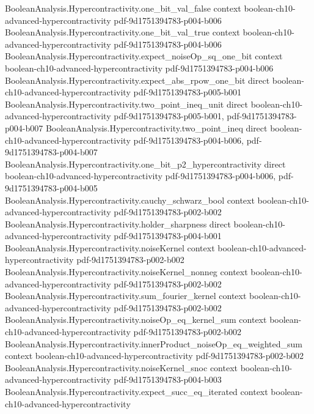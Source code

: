 \begin{theorem}
\proofstep
  {BooleanAnalysis.Hypercontractivity.one_bit_val_false}
  {context}
  {boolean-ch10-advanced-hypercontractivity}
  {pdf-9d1751394783-p004-b006}
\proofstep
  {BooleanAnalysis.Hypercontractivity.one_bit_val_true}
  {context}
  {boolean-ch10-advanced-hypercontractivity}
  {pdf-9d1751394783-p004-b006}
\proofstep
  {BooleanAnalysis.Hypercontractivity.expect_noiseOp_sq_one_bit}
  {context}
  {boolean-ch10-advanced-hypercontractivity}
  {pdf-9d1751394783-p004-b006}
\proofstep
  {BooleanAnalysis.Hypercontractivity.expect_abs_rpow_one_bit}
  {direct}
  {boolean-ch10-advanced-hypercontractivity}
  {pdf-9d1751394783-p005-b001}
\proofstep
  {BooleanAnalysis.Hypercontractivity.two_point_ineq_unit}
  {direct}
  {boolean-ch10-advanced-hypercontractivity}
  {pdf-9d1751394783-p005-b001,
    pdf-9d1751394783-p004-b007}
\proofstep
  {BooleanAnalysis.Hypercontractivity.two_point_ineq}
  {direct}
  {boolean-ch10-advanced-hypercontractivity}
  {pdf-9d1751394783-p004-b006,
    pdf-9d1751394783-p004-b007}
\proofstep
  {BooleanAnalysis.Hypercontractivity.one_bit_p2_hypercontractivity}
  {direct}
  {boolean-ch10-advanced-hypercontractivity}
  {pdf-9d1751394783-p004-b006,
    pdf-9d1751394783-p004-b005}
\proofstep
  {BooleanAnalysis.Hypercontractivity.cauchy_schwarz_bool}
  {context}
  {boolean-ch10-advanced-hypercontractivity}
  {pdf-9d1751394783-p002-b002}
\proofstep
  {BooleanAnalysis.Hypercontractivity.holder_sharpness}
  {direct}
  {boolean-ch10-advanced-hypercontractivity}
  {pdf-9d1751394783-p004-b001}
\proofstep
  {BooleanAnalysis.Hypercontractivity.noiseKernel}
  {context}
  {boolean-ch10-advanced-hypercontractivity}
  {pdf-9d1751394783-p002-b002}
\proofstep
  {BooleanAnalysis.Hypercontractivity.noiseKernel_nonneg}
  {context}
  {boolean-ch10-advanced-hypercontractivity}
  {pdf-9d1751394783-p002-b002}
\proofstep
  {BooleanAnalysis.Hypercontractivity.sum_fourier_kernel}
  {context}
  {boolean-ch10-advanced-hypercontractivity}
  {pdf-9d1751394783-p002-b002}
\proofstep
  {BooleanAnalysis.Hypercontractivity.noiseOp_eq_kernel_sum}
  {context}
  {boolean-ch10-advanced-hypercontractivity}
  {pdf-9d1751394783-p002-b002}
\proofstep
  {BooleanAnalysis.Hypercontractivity.innerProduct_noiseOp_eq_weighted_sum}
  {context}
  {boolean-ch10-advanced-hypercontractivity}
  {pdf-9d1751394783-p002-b002}
\proofstep
  {BooleanAnalysis.Hypercontractivity.noiseKernel_snoc}
  {context}
  {boolean-ch10-advanced-hypercontractivity}
  {pdf-9d1751394783-p004-b003}
\proofstep
  {BooleanAnalysis.Hypercontractivity.expect_succ_eq_iterated}
  {context}
  {boolean-ch10-advanced-hypercontractivity}

\end{theorem}
